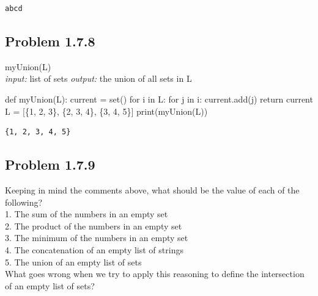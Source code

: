 \documentclass[
  letterpaper,
  DIV=11,
  numbers=noendperiod]{scrartcl}
\newenvironment{Shaded}{\begin{snugshade}}{\end{snugshade}}
\newcommand{\BuiltInTok}[1]{\textcolor[rgb]{0.00,0.23,0.31}{#1}}
\newcommand{\ControlFlowTok}[1]{\textcolor[rgb]{0.00,0.23,0.31}{#1}}
\newcommand{\DecValTok}[1]{\textcolor[rgb]{0.68,0.00,0.00}{#1}}
\newcommand{\KeywordTok}[1]{\textcolor[rgb]{0.00,0.23,0.31}{#1}}
\newcommand{\NormalTok}[1]{\textcolor[rgb]{0.00,0.23,0.31}{#1}}
\newcommand{\OperatorTok}[1]{\textcolor[rgb]{0.37,0.37,0.37}{#1}}
\begin{document}
\begin{verbatim}
abcd
\end{verbatim}

\hypertarget{problem-1.7.8}{%
\subsection{Problem 1.7.8}\label{problem-1.7.8}}

myUnion(L)\\
\emph{input:} list of sets \emph{output:} the union of all sets in L

\begin{Shaded}
\begin{Highlighting}[numbers=left,,]
\KeywordTok{def}\NormalTok{ myUnion(L): }
\NormalTok{    current }\OperatorTok{=} \BuiltInTok{set}\NormalTok{()}
    \ControlFlowTok{for}\NormalTok{ i }\KeywordTok{in}\NormalTok{ L:}
        \ControlFlowTok{for}\NormalTok{ j }\KeywordTok{in}\NormalTok{ i:}
\NormalTok{            current.add(j)}
    \ControlFlowTok{return}\NormalTok{ current}
\NormalTok{L }\OperatorTok{=}\NormalTok{ [\{}\DecValTok{1}\NormalTok{, }\DecValTok{2}\NormalTok{, }\DecValTok{3}\NormalTok{\}, \{}\DecValTok{2}\NormalTok{, }\DecValTok{3}\NormalTok{, }\DecValTok{4}\NormalTok{\}, \{}\DecValTok{3}\NormalTok{, }\DecValTok{4}\NormalTok{, }\DecValTok{5}\NormalTok{\}]}
\BuiltInTok{print}\NormalTok{(myUnion(L))}
\end{Highlighting}
\end{Shaded}

\begin{verbatim}
{1, 2, 3, 4, 5}
\end{verbatim}

\hypertarget{problem-1.7.9}{%
\subsection{Problem 1.7.9}\label{problem-1.7.9}}

Keeping in mind the comments above, what should be the value of each of
the following?\\
1. The sum of the numbers in an empty set\\
2. The product of the numbers in an empty set\\
3. The minimum of the numbers in an empty set\\
4. The concatenation of an empty list of strings\\
5. The union of an empty list of sets\\
What goes wrong when we try to apply this reasoning to define the
intersection of an empty list of sets?\\
\end{document}
